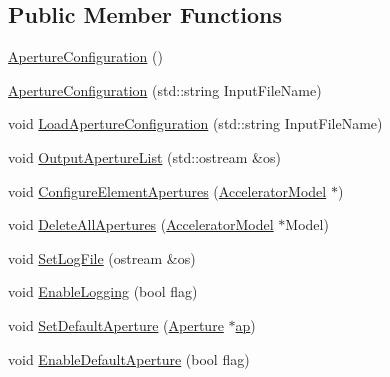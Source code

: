 \subsection*{Public Member Functions}
\begin{DoxyCompactItemize}
\item 
\hyperlink{classApertureConfiguration_ac9b95b8adbd178d7345cd147000d7038}{Aperture\+Configuration} ()
\item 
\hyperlink{classApertureConfiguration_affd6ff3a6500fb8b7aecc5d8cc7d5ab5}{Aperture\+Configuration} (std\+::string Input\+File\+Name)
\item 
void \hyperlink{classApertureConfiguration_a23e6989301d2c88027decc4c6cf63049}{Load\+Aperture\+Configuration} (std\+::string Input\+File\+Name)
\item 
void \hyperlink{classApertureConfiguration_ac57cc418854b69b0893c8a0c36386ace}{Output\+Aperture\+List} (std\+::ostream \&os)
\item 
void \hyperlink{classApertureConfiguration_af954151209360897a506d914f922f03f}{Configure\+Element\+Apertures} (\hyperlink{classAcceleratorModel}{Accelerator\+Model} $\ast$)
\item 
void \hyperlink{classApertureConfiguration_a18b3907d726e2ef8731d6fe9a8a50ea4}{Delete\+All\+Apertures} (\hyperlink{classAcceleratorModel}{Accelerator\+Model} $\ast$Model)
\item 
void \hyperlink{classApertureConfiguration_a2def09944077a1c8048ea201256234a5}{Set\+Log\+File} (ostream \&os)
\item 
void \hyperlink{classApertureConfiguration_acbb9431d139a07249cf0487f8fd4753b}{Enable\+Logging} (bool flag)
\item 
void \hyperlink{classApertureConfiguration_a71fec510b3f362a5307ffde2fb876ab7}{Set\+Default\+Aperture} (\hyperlink{classAperture}{Aperture} $\ast$\hyperlink{structApertureConfiguration_1_1ap}{ap})
\item 
void \hyperlink{classApertureConfiguration_a24391451e6a25bc59ea448bdf06bb1b4}{Enable\+Default\+Aperture} (bool flag)
\end{DoxyCompactItemize}
